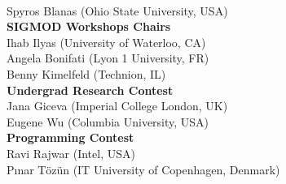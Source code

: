 {\\ Spyros Blanas \textsf{\footnotesize(Ohio State University, USA)}
\\[2.4ex]
\textbf{SIGMOD Workshops Chairs}
\\ Ihab Ilyas \textsf{\footnotesize(University of Waterloo, CA)}
\\ Angela Bonifati \textsf{\footnotesize(Lyon 1 University, FR)}
\\ Benny Kimelfeld \textsf{\footnotesize(Technion, IL)}
\\[2.4ex]
\textbf{Undergrad Research Contest}
\\ Jana Giceva \textsf{\footnotesize(Imperial College London, UK)}
\\ Eugene Wu \textsf{\footnotesize(Columbia University, USA)}
\\[2.4ex]
\textbf{Programming Contest}
\\ Ravi Rajwar \textsf{\footnotesize(Intel, USA)}
\\ Pınar Tözün \textsf{\footnotesize(IT University of Copenhagen, Denmark)}

}
